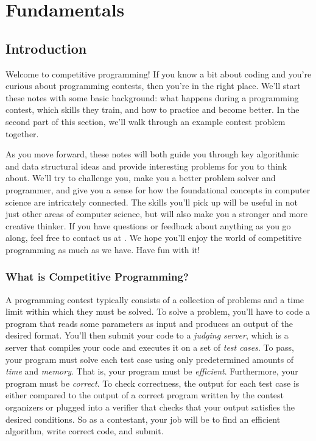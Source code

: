 \chapter{Fundamentals}

\section{Introduction}

Welcome to competitive programming! If you know a bit about coding and you're curious about programming contests, then you're in the right place. We'll start these notes with some basic background: what happens during a programming contest, which skills they train, and how to practice and become better. In the second part of this section, we'll walk through an example contest problem together.

As you move forward, these notes will both guide you through key algorithmic and data structural ideas and provide interesting problems for you to think about. We'll try to challenge you, make you a better problem solver and programmer, and give you a sense for how the foundational concepts in computer science are intricately connected. The skills you'll pick up will be useful in not just other areas of computer science, but will also make you a stronger and more creative thinker. If you have questions or feedback about anything as you go along, feel free to contact us at . We hope you'll enjoy the world of competitive programming as much as we have. Have fun with it!

\subsection{What is Competitive Programming?}

A programming contest typically consists of a collection of problems and a time limit within which they must be solved. To solve a problem, you'll have to code a program that reads some parameters as input and produces an output of the desired format. You'll then submit your code to a \emph{judging server}, which is a server that compiles your code and executes it on a set of \emph{test cases}. To pass, your program must solve each test case using only predetermined amounts of \emph{time} and \emph{memory}. That is, your program must be \textit{efficient}. Furthermore, your program must be \textit{correct}. To check correctness, the output for each test case is either compared to the output of a correct program written by the contest organizers or plugged into a verifier that checks that your output satisfies the desired conditions. So as a contestant, your job will be to find an efficient algorithm, write correct code, and submit.

